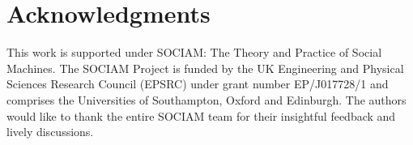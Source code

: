 \documentclass{www13-companion-accepted}
\begin{document}
\section{Acknowledgments}
This work is supported under SOCIAM: The Theory and Practice of Social Machines. The SOCIAM Project is funded by the UK Engineering and Physical Sciences Research Council (EPSRC) under grant number EP/J017728/1 and comprises the Universities of Southampton, Oxford and Edinburgh. The authors would like to thank the entire SOCIAM team for their insightful feedback and lively discussions.

%

%
%
\end{document}
